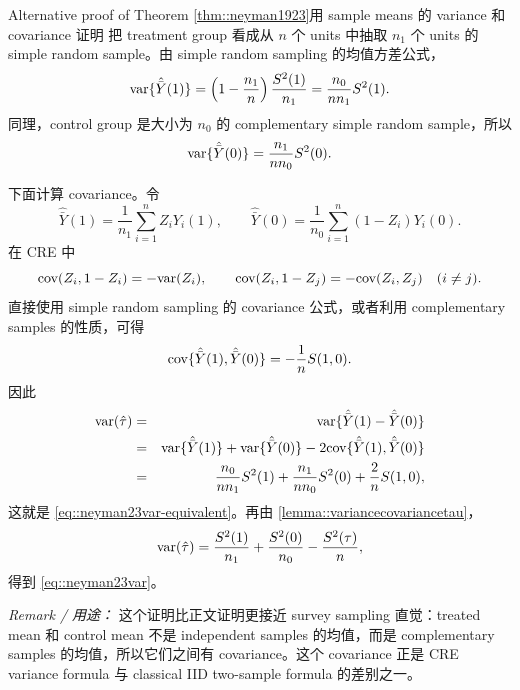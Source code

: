 \begin{exercisesolution}{Alternative proof of Theorem \ref{thm::neyman1923}}{用 sample means 的 variance 和 covariance 证明}
把 treatment group 看成从 $n$ 个 units 中抽取 $n_1$ 个 units 的 simple random sample。由 simple random sampling 的均值方差公式，
\[
\textup{var}\{\hat{\bar Y}(1)\}
=\left(1-\frac{n_1}{n}\right)\frac{S^2(1)}{n_1}
=\frac{n_0}{nn_1}S^2(1).
\]
同理，control group 是大小为 $n_0$ 的 complementary simple random sample，所以
\[
\textup{var}\{\hat{\bar Y}(0)\}
=\frac{n_1}{nn_0}S^2(0).
\]

下面计算 covariance。令
\[
\hat{\bar Y}(1)=\frac{1}{n_1}\sum_{i=1}^n Z_iY_i(1),\qquad
\hat{\bar Y}(0)=\frac{1}{n_0}\sum_{i=1}^n (1-Z_i)Y_i(0).
\]
在 CRE 中
\[
\textup{cov}(Z_i,1-Z_i)=-\textup{var}(Z_i),\qquad
\textup{cov}(Z_i,1-Z_j)=-\textup{cov}(Z_i,Z_j)\quad (i\neq j).
\]
直接使用 simple random sampling 的 covariance 公式，或者利用 complementary samples 的性质，可得
\[
\textup{cov}\{\hat{\bar Y}(1),\hat{\bar Y}(0)\}
=-\frac{1}{n}S(1,0).
\]
因此
\begin{eqnarray*}
\textup{var}(\hat\tau)
&=&\textup{var}\{\hat{\bar Y}(1)-\hat{\bar Y}(0)\}\\
&=&\textup{var}\{\hat{\bar Y}(1)\}+\textup{var}\{\hat{\bar Y}(0)\}
-2\textup{cov}\{\hat{\bar Y}(1),\hat{\bar Y}(0)\}\\
&=&\frac{n_0}{nn_1}S^2(1)+\frac{n_1}{nn_0}S^2(0)+\frac{2}{n}S(1,0),
\end{eqnarray*}
这就是 \cref{eq::neyman23var-equivalent}。再由 \cref{lemma::variancecovariancetau}，
\[
\textup{var}(\hat\tau)
=\frac{S^2(1)}{n_1}+\frac{S^2(0)}{n_0}-\frac{S^2(\tau)}{n},
\]
得到 \cref{eq::neyman23var}。

\emph{Remark / 用途：} 这个证明比正文证明更接近 survey sampling 直觉：treated mean 和 control mean 不是 independent samples 的均值，而是 complementary samples 的均值，所以它们之间有 covariance。这个 covariance 正是 CRE variance formula 与 classical IID two-sample formula 的差别之一。
\end{exercisesolution}

